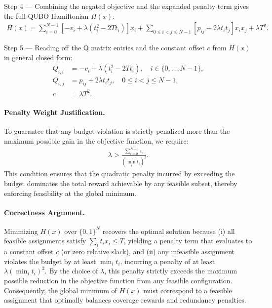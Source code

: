 \documentclass[12pt]{article}
\begin{document}
Step 4 --- Combining the negated objective and the expanded penalty term gives the full QUBO Hamiltonian $H(x)$:
\begin{align}
H(x) = \sum_{i=0}^{N-1} \left[ -v_i + \lambda(t_i^2 - 2T t_i) \right] x_i + \sum_{0 \le i < j \le N-1} \left[ p_{ij} + 2\lambda t_i t_j \right] x_i x_j + \lambda T^2.
\end{align}

Step 5 --- Reading off the Q matrix entries and the constant offset $c$ from $H(x)$ in general closed form:
\begin{align}
Q_{i,i} &= -v_i + \lambda(t_i^2 - 2T t_i), \quad i \in \{0, \dots, N-1\}, \\
Q_{i,j} &= p_{ij} + 2\lambda t_i t_j, \quad 0 \le i < j \le N-1, \\
c &= \lambda T^2.
\end{align}

\paragraph{Penalty Weight Justification.}
To guarantee that any budget violation is strictly penalized more than the maximum possible gain in the objective function, we require:
\begin{align}
\lambda > \frac{\sum_{i=0}^{N-1} v_i}{(\min_{i} t_i)^2}.
\end{align}
This condition ensures that the quadratic penalty incurred by exceeding the budget dominates the total reward achievable by any feasible subset, thereby enforcing feasibility at the global minimum.

\paragraph{Correctness Argument.}
Minimizing $H(x)$ over $\{0,1\}^N$ recovers the optimal solution because (i) all feasible assignments satisfy $\sum_i t_i x_i \le T$, yielding a penalty term that evaluates to a constant offset $c$ (or zero relative slack), and (ii) any infeasible assignment violates the budget by at least $\min_i t_i$, incurring a penalty of at least $\lambda (\min_i t_i)^2$. By the choice of $\lambda$, this penalty strictly exceeds the maximum possible reduction in the objective function from any feasible configuration. Consequently, the global minimum of $H(x)$ must correspond to a feasible assignment that optimally balances coverage rewards and redundancy penalties.
\end{document}
